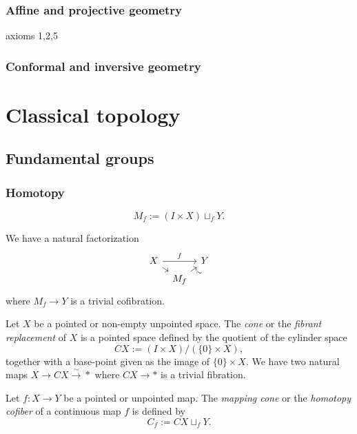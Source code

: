 \documentclass{../../large}
\begin{document}
\section{Affine and projective geometry}
axioms 1,2,5
\section{Conformal and inversive geometry}





\part{Classical topology}


\chapter{Fundamental groups}

\section{Homotopy}


\begin{prb}
\end{prb}



\begin{prb}

\[M_f:=(I\times X)\sqcup_fY.\]

We have a natural factorization
\[\begin{tikzcd}[sep=tiny]
X\ar{dr}\ar{rr}{f}&&Y\\
&M_f\ar[swap]{ur}{\sim}&
\end{tikzcd}\]
where $M_f\to Y$ is a trivial cofibration.
\end{prb}

\begin{prb}[Cones]
Let $X$ be a pointed or non-empty unpointed space.
The \emph{cone} or the \emph{fibrant replacement} of $X$ is a pointed space defined by the quotient of the cylinder space
\[CX:=(I\times X)/(\{0\}\times X),\]
together with a base-point given as the image of $\{0\}\times X$.
We have two natural maps $X\to CX\xrightarrow{\sim}*$ where $CX\to*$ is a trivial fibration.
\end{prb}



\begin{prb}
Let $f:X\to Y$ be a pointed or unpointed map.
The \emph{mapping cone} or the \emph{homotopy cofiber} of a continuous map $f$ is defined by
\[C_f:=CX\sqcup_fY.\]

\end{prb}
\end{document}
